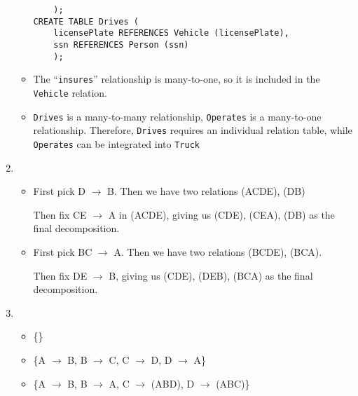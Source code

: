 \documentclass[10pt]{article}
\begin{document}
\begin{enumerate}[label=\textbf{\arabic*.}, listparindent=0.0em, itemsep=1em]
\begin{itemize}
\begin{lstlisting}
    );
CREATE TABLE Drives (
    licensePlate REFERENCES Vehicle (licensePlate),
    ssn REFERENCES Person (ssn)
    );
            \end{lstlisting}
        \item The ``\texttt{insures}'' relationship is many-to-one, so it is included in the \texttt{Vehicle} relation. 
        \item \texttt{Drives} is a many-to-many relationship, \texttt{Operates} is a many-to-one relationship. Therefore,
           \texttt{Drives} requires an individual relation table, while \texttt{Operates} can be integrated into \texttt{Truck}
        \end{itemize}
    \item 
        \begin{itemize}
            \item First pick D $\to$ B. Then we have two relations (ACDE), (DB) \par
                  Then fix CE $\to$ A in (ACDE), giving us (CDE), (CEA), (DB) as the final decomposition.
            \item First pick BC $\to$ A. Then we have two relations (BCDE), (BCA). \par
                  Then fix DE $\to$ B, giving us (CDE), (DEB), (BCA) as the final decomposition.
        \end{itemize}
    \item 
        \begin{itemize}
            \item \{\}
            \item \{A $\to$ B, B $\to$ C, C $\to$ D, D $\to$ A\}
            \item \{A $\to$ B, B $\to$ A, C $\to$ (ABD), D $\to$ (ABC)\} 
        \end{itemize}
        
\end{enumerate}
\end{document}

